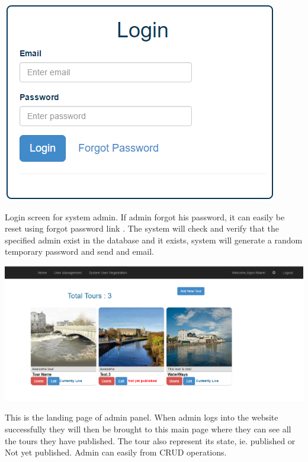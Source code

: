 		 	\begin {center}    
		 		\includegraphics{img/gctloginpage.PNG}
		 	\end{center}
		 	Login screen for system admin. If admin forgot his password, it can easily be reset using forgot password link . The system will check and verify that the specified admin exist in the database and it exists, system will generate a random temporary password and send and email. 
		 	
		 		\begin{center}    
		 			\includegraphics{img/MainPage.PNG}
		 		\end{center}
		 		This is the landing page of admin panel. When admin logs into the website successfully they will then be brought to this main page where they can see all the tours they have published. The tour also represent its state, ie. published or Not yet published. Admin can easily from CRUD operations. 
		 		

